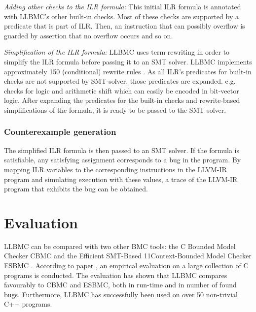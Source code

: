 \documentclass[14pt]{article}
\begin{document}
 \par \textit{Adding other checks to the ILR formula:} This initial ILR formula is annotated with LLBMC's other built-in checks. Most of these checks are supported by a predicate that is part of ILR. Then, an instruction that can possibly overflow is guarded by assertion that no overflow occurs and so on. 
 
 \par \textit{Simplification of the ILR formula:} LLBMC uses term rewriting in order to simplify the ILR formula before passing it to an SMT solver. LLBMC implements  approximately 150 (conditional) rewrite rules \cite{llbmc0}. As all ILR's predicates for built-in checks are not supported by SMT-solver, those predicates are expanded. e.g. checks for logic and arithmetic shift which can easily be encoded in bit-vector logic. After expanding the predicates for the built-in checks and rewrite-based simplifications of the formula, it is ready to be passed to the SMT solver.
  
  
  \subsubsection{Counterexample generation}\label{Counterexample generation} The simplified ILR formula is then passed to an SMT solver. If the formula is satisfiable, any satisfying assignment corresponds to a bug in the program. By mapping ILR variables to the corresponding instructions in the LLVM-IR program and simulating execution with these values, a trace of the LLVM-IR program that exhibits the bug can be obtained. 
  
  
\section{Evaluation}\label{Evaluation}
LLBMC can be compared with two other BMC tools: the C Bounded Model Checker CBMC  \cite{CBMC} and the Efficient SMT-Based
11Context-Bounded Model Checker ESBMC  \cite{ESBMC}. According to paper \cite{llbmc0},  an empirical evaluation on a large collection of C programs is conducted.  The evaluation has shown that LLBMC compares favourably to CBMC and ESBMC, both in run-time and in number of found bugs. Furthermore, LLBMC has successfully been used on over 50 non-trivial C++ programs. 
  
\end{document}
